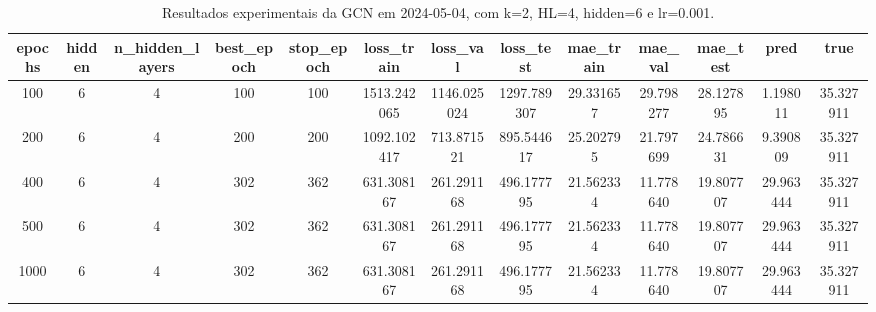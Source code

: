 \begin{table}[h]
\centering
\caption{Resultados experimentais da GCN em 2024-05-04, com k=2, HL=4, hidden=6 e lr=0.001.}
\label{tab:gcn_results_k2_hl4_h6_d20240504}
\begin{tabular}{ccccccccccccc}
\toprule
epochs & hidden & n\_hidden\_layers & best\_epoch & stop\_epoch & loss\_train & loss\_val & loss\_test & mae\_train & mae\_val & mae\_test & pred & true \\
\midrule
100 & 6 & 4 & 100 & 100 & 1513.242065 & 1146.025024 & 1297.789307 & 29.331657 & 29.798277 & 28.127895 & 1.198011 & 35.327911 \\
200 & 6 & 4 & 200 & 200 & 1092.102417 & 713.871521 & 895.544617 & 25.202795 & 21.797699 & 24.786631 & 9.390809 & 35.327911 \\
400 & 6 & 4 & 302 & 362 & 631.308167 & 261.291168 & 496.177795 & 21.562334 & 11.778640 & 19.807707 & 29.963444 & 35.327911 \\
500 & 6 & 4 & 302 & 362 & 631.308167 & 261.291168 & 496.177795 & 21.562334 & 11.778640 & 19.807707 & 29.963444 & 35.327911 \\
1000 & 6 & 4 & 302 & 362 & 631.308167 & 261.291168 & 496.177795 & 21.562334 & 11.778640 & 19.807707 & 29.963444 & 35.327911 \\
\bottomrule
\end{tabular}
\end{table}
